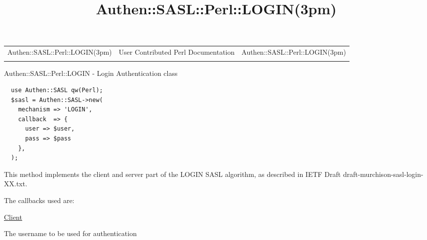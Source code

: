 \documentclass[]{article}
\title{Authen::SASL::Perl::LOGIN(3pm)}
\author{}
\date{}
\renewcommand{\emph}[1]{\underline{#1}}
\begin{document}
\maketitle

\begin{longtable}[c]{@{}lll@{}}
\toprule\addlinespace
Authen::SASL::Perl::LOGIN(3pm) & User Contributed Perl Documentation &
Authen::SASL::Perl::LOGIN(3pm)
\\\addlinespace
\bottomrule
\end{longtable}


Authen::SASL::Perl::LOGIN - Login Authentication class


\begin{verbatim}
  use Authen::SASL qw(Perl);
  $sasl = Authen::SASL->new(
    mechanism => 'LOGIN',
    callback  => {
      user => $user,
      pass => $pass
    },
  );
\end{verbatim}


This method implements the client and server part of the LOGIN SASL
algorithm, as described in IETF Draft draft-murchison-sasl-login-XX.txt.


The callbacks used are:

\emph{Client}

\begin{description}
\itemsep1pt\parskip0pt
\item[user]
The username to be used for authentication
\end{description}
\end{document}
